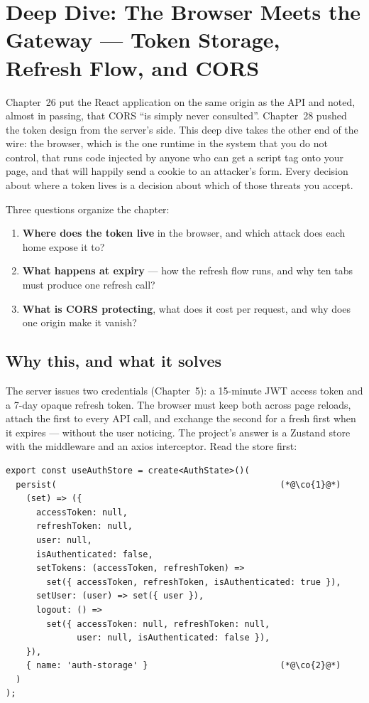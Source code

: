 \chapter{Deep Dive: The Browser Meets the Gateway --- Token Storage, Refresh Flow, and CORS}
\label{ch:dd-frontend-auth}

Chapter~26 put the React application on the same origin as the API and
noted, almost in passing, that CORS ``is simply never consulted''.
Chapter~28 pushed the token design from the server's side. This deep
dive takes the other end of the wire: the browser, which is the one
runtime in the system that you do not control, that runs code injected
by anyone who can get a script tag onto your page, and that will
happily send a cookie to an attacker's form. Every decision about where
a token lives is a decision about which of those threats you accept.

Three questions organize the chapter:

\begin{enumerate}
  \item \textbf{Where does the token live} in the browser, and which
  attack does each home expose it to?
  \item \textbf{What happens at expiry} --- how the refresh flow runs,
  and why ten tabs must produce one refresh call?
  \item \textbf{What is CORS protecting}, what does it cost per
  request, and why does one origin make it vanish?
\end{enumerate}

\section{Why this, and what it solves}

The server issues two credentials (Chapter~5): a 15-minute JWT access
token and a 7-day opaque refresh token. The browser must keep both
across page reloads, attach the first to every API call, and exchange
the second for a fresh first when it expires --- without the user
noticing. The project's answer is a Zustand store with the
 middleware and an axios interceptor. Read the store
first:

\begin{lstlisting}
export const useAuthStore = create<AuthState>()(
  persist(                                            (*@\co{1}@*)
    (set) => ({
      accessToken: null,
      refreshToken: null,
      user: null,
      isAuthenticated: false,
      setTokens: (accessToken, refreshToken) =>
        set({ accessToken, refreshToken, isAuthenticated: true }),
      setUser: (user) => set({ user }),
      logout: () =>
        set({ accessToken: null, refreshToken: null,
              user: null, isAuthenticated: false }),
    }),
    { name: 'auth-storage' }                          (*@\co{2}@*)
  )
);
\end{lstlisting}

